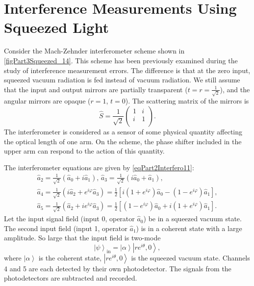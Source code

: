 \section{Interference Measurements Using Squeezed Light}
Consider the Mach-Zehnder interferometer scheme shown in
\autoref{figPart3Squeezed_14}.
This scheme has been previously examined during the study of
interference measurement errors. The difference is that at the zero
input, squeezed vacuum radiation is fed instead of vacuum radiation.
We still assume that the input and output mirrors are partially transparent ($t
=r =\frac{1}{\sqrt{2}}$), and the angular mirrors are opaque ($r = 1$, $t =
0$). The scattering matrix of the mirrors is 
\begin{equation}
\hat{S} = \frac{1}{\sqrt{2}}\left(
\begin{array}{cc}
1 & i \\
i & 1 \\
\end{array}
\right).
\nonumber
\end{equation}
The interferometer is considered as a sensor of some physical quantity
affecting the optical length of one arm. On the scheme,
the phase shifter included in the upper arm can respond to the
action of this quantity.



The interferometer equations are given by \eqref{eqPart2Interfero11}:
\begin{eqnarray}
\hat{a}_2 = \frac{1}{\sqrt{2}} \left(\hat{a}_0 + i \hat{a}_1\right),
\,
\hat{a}_3 = \frac{1}{\sqrt{2}} \left(i \hat{a}_0 + \hat{a}_1\right),
\nonumber \\
\hat{a}_4 = \frac{1}{\sqrt{2}} \left(i \hat{a}_2 + e^{i \varphi}
\hat{a}_3\right) = 
\frac{1}{2}\left[
i \left(1 + e^{i \varphi}\right)\hat{a}_0 -
\left(1 - e^{i \varphi}\right)\hat{a}_1
\right],
\nonumber \\
\hat{a}_5 = \frac{1}{\sqrt{2}} \left(\hat{a}_2 + i e^{i \varphi}
\hat{a}_3\right) = 
\frac{1}{2}\left[
\left(1 - e^{i \varphi}\right)\hat{a}_0 +
i \left(1 + e^{i \varphi}\right)\hat{a}_1
\right].
\label{eqPart3SqueezedAddAddAdd2}
\end{eqnarray}
Let the input signal field (input 0, operator $\hat{a}_0$)
be in a squeezed vacuum state. The second input field
(input 1, operator $\hat{a}_1$) is in a coherent state with
a large amplitude. So large that the input field is
two-mode 
\[
\left|\psi\right>_{\mbox{in}} =
\left|\alpha\right>
\left|re^{i \theta}, 0\right>,
\]
where $\left|\alpha\right>$ is the coherent state,
$\left|re^{i \theta}, 0\right>$ is the squeezed vacuum state. Channels 4
and 5 are each detected by their own photodetector. The signals from
the photodetectors are subtracted and recorded.

